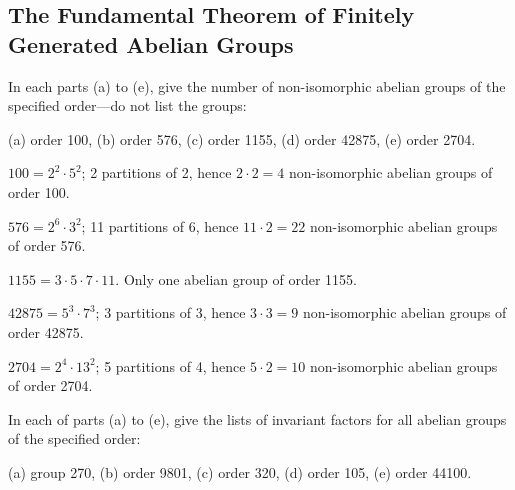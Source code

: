 \newpage

\subsection{The Fundamental Theorem of Finitely Generated Abelian Groups}

\begin{exercise}\label{ex5.2.1}
    In each parts (a) to (e), give the number of non-isomorphic abelian groups of the specified order---do not list the groups:

    \noindent (a) order 100, \quad (b) order 576, \quad (c) order 1155, \quad (d) order 42875, \quad (e) order 2704.
\end{exercise}

\begin{solalph}
    \item $100 = 2^2 \cdot 5^2$; 2 partitions of 2, hence $2 \cdot 2 = 4$ non-isomorphic abelian groups of order 100.
    \item $576 = 2^6 \cdot 3^2$; 11 partitions of 6, hence $11 \cdot 2 = 22$ non-isomorphic abelian groups of order 576.
    \item $1155 = 3 \cdot 5 \cdot 7 \cdot 11$. Only one abelian group of order 1155.
    \item $42875 = 5^3 \cdot 7^3$; 3 partitions of 3, hence $3 \cdot 3 = 9$ non-isomorphic abelian groups of order 42875.
    \item $2704 = 2^4 \cdot 13^2$; 5 partitions of 4, hence $5 \cdot 2 = 10$ non-isomorphic abelian groups of order 2704.
\end{solalph}

\begin{exercise}\label{ex5.2.2}
    In each of parts (a) to (e), give the lists of invariant factors for all abelian groups of the specified order:

    \noindent (a) group 270, \quad (b) order 9801, \quad (c) order 320, \quad (d) order 105, \quad (e) order 44100.
\end{exercise}

